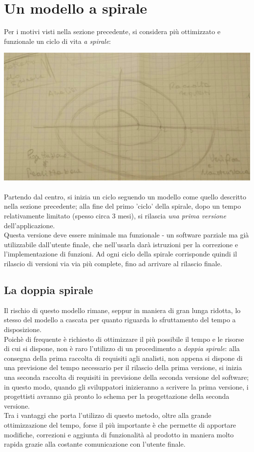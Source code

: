 \section{Un modello a spirale}
Per i motivi visti nella sezione precedente, si considera più ottimizzato e funzionale un ciclo di vita \textit{a spirale}:

\includegraphics[width=\textwidth]{spiral.jpg} \hfill \\ \\
Partendo dal centro, si inizia un ciclo seguendo un modello come quello descritto nella sezione precedente; alla fine del primo 'ciclo' della spirale, dopo un tempo relativamente limitato (spesso circa 3 mesi), si rilascia \textit{una prima \textit{}versione} dell'applicazione.\\
Questa versione deve essere minimale ma funzionale - un software parziale ma già utilizzabile dall'utente finale, che nell'usarla darà istruzioni per la correzione e l'implementazione di funzioni. Ad ogni ciclo della spirale corrisponde quindi il rilascio di versioni via via più complete, fino ad arrivare al rilascio finale.
\subsection{La doppia spirale}
Il rischio di questo modello rimane, seppur in maniera di gran lunga ridotta, lo stesso del modello a cascata per quanto riguarda lo sfruttamento del tempo a disposizione. \\
Poichè di frequente è richiesto di ottimizzare il più possibile il tempo e le risorse di cui si dispone, non è raro l'utilizzo di un procedimento a \textit{doppia spirale}: alla consegna della prima raccolta di requisiti agli analisti, non appena si dispone di una previsione del tempo necessario per il rilascio della prima versione, si inizia una seconda raccolta di requisiti in previsione della seconda versione del software; in questo modo, quando gli sviluppatori inizieranno a scrivere la prima versione, i progettisti avranno già pronto lo schema per la progettazione della seconda versione. \\
Tra i vantaggi che porta l'utilizzo di questo metodo, oltre alla grande ottimizzazione del tempo, forse il più importante è che permette di apportare modifiche, correzioni e aggiunta di funzionalità al prodotto in maniera molto rapida grazie alla costante comunicazione con l'utente finale.